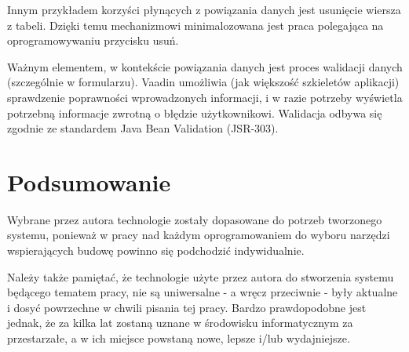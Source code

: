 Innym przykładem korzyści płynących z powiązania danych jest usunięcie wiersza z tabeli. Dzięki temu mechanizmowi minimalozowana jest praca polegająca na oprogramowywaniu przycisku usuń.

Ważnym elementem, w kontekście powiązania danych jest proces walidacji danych (szczególnie w formularzu). Vaadin umożliwia (jak większość szkieletów aplikacji) sprawdzenie poprawności wprowadzonych informacji, i w razie potrzeby wyświetla potrzebną informacje zwrotną o błędzie użytkownikowi. Walidacja odbywa się zgodnie ze standardem Java Bean Validation (JSR-303).
\newpage
\section{Podsumowanie}
Wybrane przez autora technologie zostały dopasowane do potrzeb tworzonego systemu, ponieważ w pracy nad każdym oprogramowaniem do wyboru narzędzi wspierających budowę powinno się podchodzić indywidualnie.

Należy także pamiętać, że technologie użyte przez autora do stworzenia systemu będącego tematem pracy, nie są uniwersalne - a wręcz przeciwnie - były aktualne i dosyć powrzechne w chwili pisania tej pracy. Bardzo prawdopodobne jest jednak, że za kilka lat zostaną uznane w środowisku informatycznym za przestarzałe, a w ich miejsce powstaną nowe, lepsze i/lub wydajniejsze.

